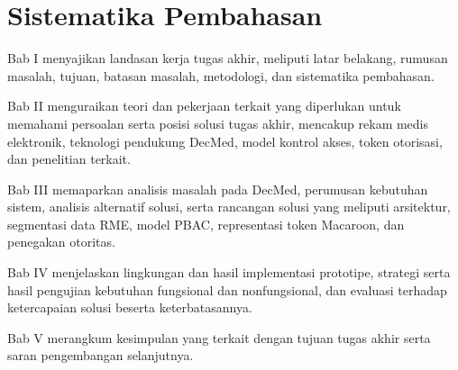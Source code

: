 \section{Sistematika Pembahasan}
\label{sec:sistematika-pembahasan}

Bab I menyajikan landasan kerja tugas akhir, meliputi latar belakang, rumusan masalah, tujuan, batasan masalah, metodologi, dan sistematika pembahasan.

Bab II menguraikan teori dan pekerjaan terkait yang diperlukan untuk memahami persoalan serta posisi solusi tugas akhir, mencakup rekam medis elektronik, teknologi pendukung DecMed, model kontrol akses, token otorisasi, dan penelitian terkait.

Bab III memaparkan analisis masalah pada DecMed, perumusan kebutuhan sistem, analisis alternatif solusi, serta rancangan solusi yang meliputi arsitektur, segmentasi data RME, model PBAC, representasi token Macaroon, dan penegakan otoritas.

Bab IV menjelaskan lingkungan dan hasil implementasi prototipe, strategi serta hasil pengujian kebutuhan fungsional dan nonfungsional, dan evaluasi terhadap ketercapaian solusi beserta keterbatasannya.

Bab V merangkum kesimpulan yang terkait dengan tujuan tugas akhir serta saran pengembangan selanjutnya.
